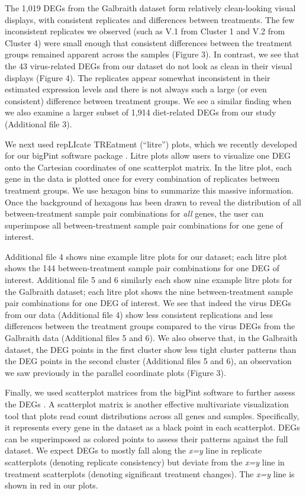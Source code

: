 \documentclass{bmcart}
\begin{document}
\begin{linenumbers}
\begin{doublespacing}
The 1,019 DEGs from the Galbraith dataset form relatively clean-looking visual displays, with consistent replicates and differences between treatments. The few inconsistent replicates we observed (such as V.1 from Cluster 1 and V.2 from Cluster 4) were small enough that consistent differences between the treatment groups remained apparent across the samples (Figure 3). In contrast, we see that the 43 virus-related DEGs from our dataset do not look as clean in their visual displays (Figure 4). The replicates appear somewhat inconsistent in their estimated expression levels and there is not always such a large (or even consistent) difference between treatment groups. We see a similar finding when we also examine a larger subset of 1,914 diet-related DEGs from our study (Additional file 3).

We next used repLIcate TREatment (``litre'') plots, which we recently developed for our bigPint software package \cite{bigpint}. Litre plots allow users to visualize one DEG onto the Cartesian coordinates of one scatterplot matrix. In the litre plot, each gene in the data is plotted once for every combination of replicates between treatment groups. We use hexagon bins to summarize this massive information. Once the background of hexagons has been drawn to reveal the distribution of all between-treatment sample pair combinations for \textit{all} genes, the user can superimpose all between-treatment sample pair combinations for one gene of interest.

Additional file 4 shows nine example litre plots for our dataset; each litre plot shows the 144 between-treatment sample pair combinations for one DEG of interest. Additional file 5 and 6 similarly each show nine example litre plots for the Galbraith dataset; each litre plot shows the nine between-treatment sample pair combinations for one DEG of interest. We see that indeed the virus DEGs from our data (Additional file 4) show less consistent replications and less differences between the treatment groups compared to the virus DEGs from the Galbraith data (Additional files 5 and 6). We also observe that, in the Galbraith dataset, the DEG points in the first cluster show less tight cluster patterns than the DEG points in the second cluster (Additional files 5 and 6), an observation we saw previously in the parallel coordinate plots (Figure 3).

Finally, we used scatterplot matrices from the bigPint software to further assess the DEGs \cite{bigpint}. A scatterplot matrix is another effective multivariate visualization tool that plots read count distributions across all genes and samples. Specifically, it represents every gene in the dataset as a black point in each scatterplot. DEGs can be superimposed as colored points to assess their patterns against the full dataset. We expect DEGs to mostly fall along the \textit{x=y} line in replicate scatterplots (denoting replicate consistency) but deviate from the \textit{x=y} line in treatment scatterplots (denoting significant treatment changes). The \textit{x=y} line is shown in red in our plots.


\end{doublespacing}
\end{linenumbers}
\end{document}
